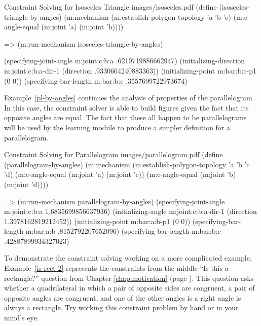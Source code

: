\begin{pdf-example}
[label=solve-i-t]
{Constraint Solving for Isosceles Triangle}
{images/isosceles.pdf}
(define (isosceles-triangle-by-angles)
  (m:mechanism
   (m:establish-polygon-topology 'a 'b 'c)
   (m:c-angle-equal (m:joint 'a)
                    (m:joint 'b))))

=> (m:run-mechanism  isosceles-triangle-by-angles)

(specifying-joint-angle m:joint:c:b:a .6219719886662947)
(initializing-direction m:joint:c:b:a-dir-1 (direction .9330664240883363))
(initializing-point m:bar:b:c-p1 (0 0))
(specifying-bar-length m:bar:b:c .3557699722973674)
\end{pdf-example}

Example~\ref{pl-by-angles} continues the analysis of properties of the
parallelogram. In this case, the constraint solver is able to build
figures given the fact that its opposite angles are equal. The fact
that these all happen to be parallelograms will be used by the
learning module to produce a simpler definition for a parallelogram.

\enlargethispage*{-\baselineskip}

\begin{pdf-example}
[label=pl-by-angles]
{Constraint Solving for Parallelogram}
{images/parallelogram.pdf}
(define (parallelogram-by-angles)
  (m:mechanism
   (m:establish-polygon-topology 'a 'b 'c 'd)
   (m:c-angle-equal (m:joint 'a)
                    (m:joint 'c))
   (m:c-angle-equal (m:joint 'b)
                    (m:joint 'd))))

=> (m:run-mechanism parallelogram-by-angles)
(specifying-joint-angle m:joint:c:b:a 1.6835699856637936)
(initializing-angle m:joint:c:b:a-dir-1 (direction 1.3978162819212452))
(initializing-point m:bar:a:b-p1 (0 0))
(specifying-bar-length m:bar:a:b .8152792207652096)
(specifying-bar-length m:bar:b:c .42887899934327023)
\end{pdf-example}

To demonstrate the constraint solving working on a more complicated
example, Example~\ref{is-rect-2} represents the constraints from the
middle ``Is this a rectangle?'' question from Chapter
\ref{chap:motivation} (page \pageref{example-1}). This question asks
whether a quadrilateral in which a pair of opposite sides are
congruent, a pair of opposite angles are congruent, and one of the
other angles is a right angle is always a rectangle. Try working this
constraint problem by hand or in your mind's eye.

